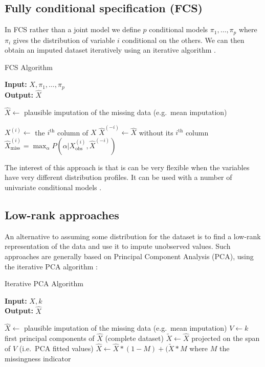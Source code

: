 		\subsection{Fully conditional specification (FCS)}
In FCS rather than a joint model we define $p$ conditional models $\pi_1, \ldots, \pi_p$ where $\pi_i$ gives the distribution of variable $i$ conditional on the others. We can then obtain an imputed dataset iteratively using an iterative algorithm \cite{MICE_founding}.
\begin{algorithm}[H]
	\caption{FCS Algorithm}
	\hspace*{\algorithmicindent} \textbf{Input:} $X, \pi_1, \ldots, \pi_p$\\
 	\hspace*{\algorithmicindent} \textbf{Output:} $\hat{X}$
	\begin{algorithmic}[1]
		\State $\hat{X} \leftarrow $ plausible imputation of the missing data (e.g.\ mean imputation)

				\State $X^{(i)} \leftarrow $ the $i^{\text{th}}$ column of $X$
				\State $\hat{X}^{(-i)} \leftarrow \hat{X}$ without its $i^{\text{th}}$ column
				\State $\hat{X}^{(i)}_{\text{miss}} = \max_{\alpha} P(\alpha \vert {X}^{(i)}_{\text{obs}}, \hat{X}^{(-i)})$
			\EndFor
		\EndWhile
	\end{algorithmic}
\end{algorithm}

The interest of this approach is that is can be very flexible when the variables have very different distribution profiles. It can be used with a number of univariate conditional models \cite{MICE_founding}\cite{stekhoven2015missforest}\cite{van2007multiple}.

		\subsection{Low-rank approaches}
An alternative to assuming some distribution for the dataset is to find a low-rank representation of the data and use it to impute unobserved values. Such approaches \cite{josse2012missPCA}\cite{chen2004missSVD}\cite{brand2002incremental} are generally based on Principal Component Analysis (PCA)\cite{PCA}, using the iterative PCA algorithm \cite{iter_PCA}:		
		\begin{algorithm}[H]
	\caption{Iterative PCA Algorithm}
	\hspace*{\algorithmicindent} \textbf{Input:} $X, k$ \\
 	\hspace*{\algorithmicindent} \textbf{Output:} $\hat{X}$
	\begin{algorithmic}[1]
		\State $\hat{X} \leftarrow $ plausible imputation of the missing data (e.g.\ mean imputation)
			\State $V \leftarrow k$ first principal components of $\hat{X}$ (complete dataset)
			\State $\tilde{X} \leftarrow \hat{X}$ projected on the span of $V$ (i.e.\ PCA fitted values)
			\State $\hat{X} \leftarrow \hat{X} * (1-M) + (\tilde{X} * M$ where $M$ the missingness indicator
		\EndWhile
	\end{algorithmic}
\end{algorithm}		

